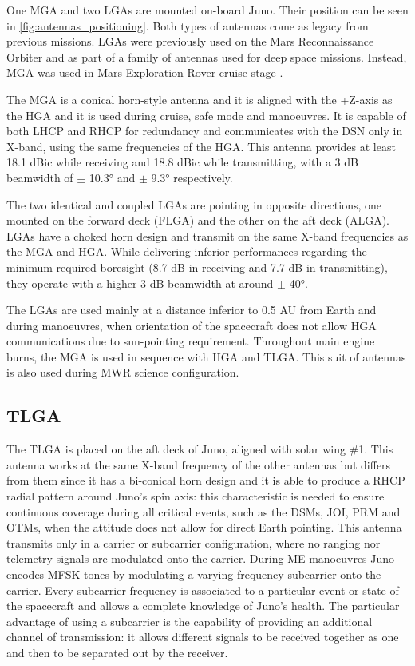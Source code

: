 One MGA and two LGAs are mounted on-board Juno. Their position can be seen in \autoref{fig:antennas_positioning}. Both types of antennas come as legacy from previous missions. LGAs were previously used on the Mars Reconnaissance Orbiter and as part of a family of antennas used for deep space missions. Instead, MGA was used in Mars Exploration Rover cruise stage \cite{telecommunication_antennas}.

The MGA is a conical horn-style antenna and it is aligned with the +Z-axis as the HGA and it is used during cruise, safe mode and manoeuvres. It is capable of both LHCP and RHCP for redundancy and communicates with the DSN only in X-band, using the same frequencies of the HGA. This antenna provides at least 18.1 dBic while receiving and 18.8 dBic while transmitting, with a 3 dB beamwidth of $\pm$ 10.3° and $\pm$ 9.3° respectively.

The two identical and coupled LGAs are pointing in opposite directions, one mounted on the forward deck (FLGA) and the other on the aft deck (ALGA). LGAs have a choked horn design and transmit on the same X-band frequencies as the MGA and HGA. While delivering inferior performances regarding the minimum required boresight (8.7 dB in receiving and 7.7 dB in transmitting), they operate with a higher 3 dB beamwidth at around $\pm$ 40°\cite{juno_telecommunication}.

The LGAs are used mainly at a distance inferior to 0.5 AU from Earth and during manoeuvres, when orientation of the spacecraft does not allow HGA communications due to sun-pointing requirement. Throughout main engine burns, the MGA is used in sequence with HGA and TLGA. This suit of antennas is also used during MWR science configuration.

\subsection{TLGA}
\label{subsec:tlga}

The TLGA is placed on the aft deck of Juno, aligned with solar wing $\#$1. This antenna works at the same X-band frequency of the other antennas but differs from them since it has a bi-conical horn design and it is able to produce a RHCP radial pattern around Juno's spin axis: this characteristic is needed to ensure continuous coverage during all critical events, such as the DSMs, JOI, PRM and OTMs, when the attitude does not allow for direct Earth pointing.
This antenna transmits only in a carrier or subcarrier configuration, where no ranging nor telemetry signals are modulated onto the carrier. During ME manoeuvres Juno encodes MFSK tones by modulating a varying frequency subcarrier onto the carrier.
Every subcarrier frequency is associated to a particular event or state of the spacecraft and allows a complete knowledge of Juno's health. The particular advantage of using a subcarrier is the capability of providing an additional channel of transmission: it allows different signals to be received together as one and then to be separated out by the receiver.


